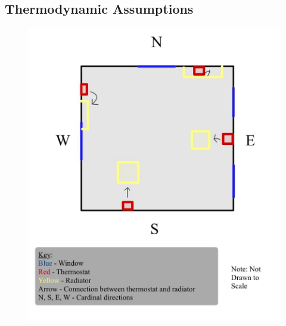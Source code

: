 \documentclass[conference,letterpaper]{IEEEtran}
\begin{document}
\subsection{Thermodynamic Assumptions}
\begin{figure}[ht!]
\centering
\centering
\includegraphics[scale=0.2]{room_2.jpg}
\centering

\end{figure}
\end{document}
